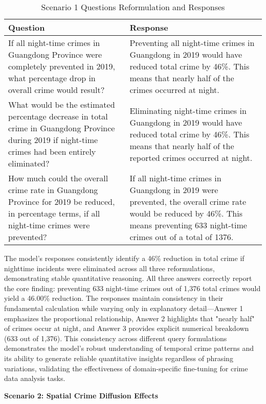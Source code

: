 \begin{table}[hbtp]
\centering
\small
\begin{tabular}{|p{}|p{}|}
\hline
\textbf{Question} & \textbf{Response} \\
\hline
If all night-time crimes in Guangdong Province were completely prevented in 2019, what percentage drop in overall crime would result? & Preventing all night-time crimes in Guangdong in 2019 would have reduced total crime by 46\%. This means that nearly half of the crimes occurred at night. \\
\hline
What would be the estimated percentage decrease in total crime in Guangdong Province during 2019 if night-time crimes had been entirely eliminated? & Eliminating night-time crimes in Guangdong in 2019 would have reduced total crime by 46\%. This means that nearly half of the reported crimes occurred at night. \\
\hline
How much could the overall crime rate in Guangdong Province for 2019 be reduced, in percentage terms, if all night-time crimes were prevented? & If all night-time crimes in Guangdong in 2019 were prevented, the overall crime rate would be reduced by 46\%. This means preventing 633 night-time crimes out of a total of 1376. \\
\hline
\end{tabular}
\caption{Scenario 1 Questions Reformulation and Responses}
\label{tab:questions_responses}
\end{table}

The model's responses consistently identify a 46\% reduction in total crime if nighttime incidents were eliminated across all three reformulations, demonstrating stable quantitative reasoning. All three answers correctly report the core finding: preventing 633 night-time crimes out of 1,376 total crimes would yield a 46.00\% reduction. The responses maintain consistency in their fundamental calculation while varying only in explanatory detail—Answer 1 emphasizes the proportional relationship, Answer 2 highlights that "nearly half" of crimes occur at night, and Answer 3 provides explicit numerical breakdown (633 out of 1,376). This consistency across different query formulations demonstrates the model's robust understanding of temporal crime patterns and its ability to generate reliable quantitative insights regardless of phrasing variations, validating the effectiveness of domain-specific fine-tuning for crime data analysis tasks.


\noindent \textbf{Scenario 2: Spatial Crime Diffusion Effects}  %

